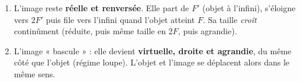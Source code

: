 \documentclass[11pt,a4paper]{article}
\begin{document}
\begin{corrige}
\begin{enumerate}[label=\alph*)]
  \item L'image reste \textbf{réelle et renversée}. Elle part de $F'$ (objet à l'infini), s'éloigne
        vers $2F'$ puis file vers l'infini quand l'objet atteint $F$. Sa taille \emph{croît}
        continûment (réduite, puis même taille en $2F$, puis agrandie).
  \item L'image « bascule » : elle devient \textbf{virtuelle, droite et agrandie}, du même côté que
        l'objet (régime loupe). L'objet et l'image se déplacent alors dans le même sens.
\end{enumerate}
\end{corrige}
\end{document}
